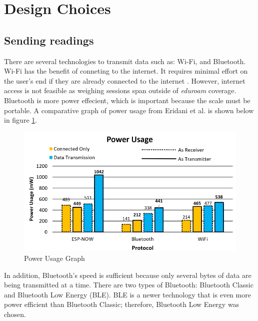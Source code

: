 \documentclass[class=report,11pt,crop=false]{standalone}
\begin{document}
			
		
	
		
	
	\section{Design Choices}
		
	
		\subsection{Sending readings}
		There are several technologies to transmit data such as: Wi-Fi, and Bluetooth. 
		Wi-Fi has the benefit of conneting to the internet. It requires minimal effort on the user's end if they are already connected to the internet . However, internet access is not feasible as weighing sessions span outside of \textit{eduroam} coverage.
		Bluetooth is more power effecient, which is important because the scale must be portable. 
		A comparative graph of power usage from Eridani et al. \cite{comparitiveEspnow} is shown below in figure \ref{fig:power-usage}.
		
		\begin{figure}[h!]
			\centering
			\includegraphics[scale=0.7]{"Figures/Power usage"}
			\caption{Power Usage Graph}
			\label{fig:power-usage}
		\end{figure}
		
		In addition, Bluetooth's speed is sufficient because only several bytes of data are being transmitted at a time.
		There are two types of Bluetooth: Bluetooth Classic and Bluetooth Low Energy (BLE). BLE is a newer technology that is even more power efficient than Bluetooth Classic; therefore, Bluetooth Low Energy was chosen.
		
		
		
\end{document}
